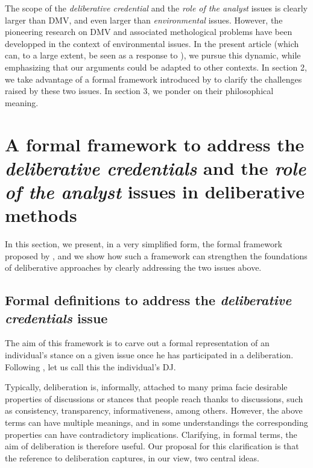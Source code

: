 \documentclass[version=3.21, pagesize, twoside=off, bibliography=totoc, DIV=calc, fontsize=12pt, a4paper, french, english]{scrartcl}
\begin{document}
{The scope of the \emph{deliberative credential} and the \emph{role of the analyst} issues is clearly larger than DMV, and even larger than \emph{environmental} issues. 
However, the pioneering research on DMV and associated methological problems have been developped in the context of environmental issues. 
In the present article (which can, to a large extent, be seen as a response to \citet{bartkowski_beyond_2018}), we pursue this dynamic, while emphasizing that our arguments could be adapted to other contexts. In section 2, we take advantage of a formal framework introduced by \citet{cailloux_formal_2019} to clarify the challenges raised by these two issues.
In section 3, we ponder on their philosophical meaning.

\section{A formal framework to address the \emph{deliberative credentials} and the \emph{role of the analyst} issues in deliberative methods}
In this section, we present, in a very simplified form, the formal framework proposed by \citet{cailloux_formal_2019}, and we show how such a framework can strengthen the foundations of deliberative approaches by clearly addressing the two issues above.

\subsection{Formal definitions to address the \emph{deliberative credentials} issue}
The aim of this framework is to carve out a formal representation of an individual's stance on a given issue once he has participated in a deliberation. 
Following \citet{cailloux_formal_2019}, let us call this the individual's \ac{DJ}. 

Typically, deliberation is, informally, attached to many prima facie desirable properties of discussions or stances that people reach thanks to discussions, such as consistency, transparency, informativeness, among others. However, the above terms can have multiple meanings, and in some understandings the corresponding properties can have contradictory implications. Clarifying, in formal terms, the aim of deliberation is therefore useful. Our proposal for this clarification is that the reference to deliberation captures, in our view, two central ideas.

}
\end{document}
